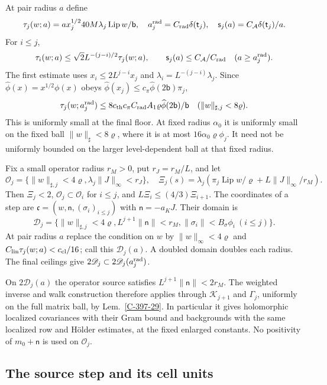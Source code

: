 \documentclass[11pt,letterpaper,reqno]{amsart}
\theoremstyle{definition}
\theoremstyle{remark}
\begin{document}
At pair radius $a$ define
\[
 \tau_j(w;a)=a x_j^{1/2}40M\lambda_j\operatorname{Lip}w/\mathsf b,
 \quad a_j^{\rm rad}=C_{\rm rad}\delta(\mathsf t_j),\quad
 \mathsf s_j(a)=C_{\mathcal A}\delta(\mathsf t_j)/a.
\]
For $i\le j$,
\begin{equation}\label{eq:qcd-source-radius-lag}
 \tau_i(w;a)\le\sqrt2L^{-(j-i)/2}\tau_j(w;a),\qquad
 \mathsf s_j(a)\le C_{\mathcal A}/C_{\rm rad}\quad(a\ge a_j^{\rm rad}).
\end{equation}
The first estimate uses $x_i\le2L^{j-i}x_j$ and
$\lambda_i=L^{-(j-i)}\lambda_j$.
Since $\widehat\phi(x)=x^{1/2}\phi(x)$ obeys
$\widehat\phi(x_j)\le c_\pi\widehat\phi(2\mathsf b)\pi_j$,
\[
 \tau_j(w;a_j^{\rm rad})\le
 8c_{\rm th}c_\pi C_{\rm rad}A_1\varrho
                       \widehat\phi(2\mathsf b)/\mathsf b
 \quad(\|w\|_{\sharp,j}<8\varrho).
\]
This is uniformly small at the final floor. At fixed radius
$\alpha_0$ it is uniformly small on the fixed ball
$\|w\|_\sharp<8\varrho$, where it is at most
$16\alpha_0\varrho\phi_j$. It need not be uniformly bounded
on the larger level-dependent ball at that fixed radius.

Fix a small operator radius $r_M>0$, put $r_J=r_M/L$, and let
\[
 \mathscr O_j=\{\|w\|_{\sharp,j}<4\varrho,
                    \lambda_j\|J\|_\infty<r_J\},\quad
 \Xi_j(s)=\lambda_j\left(
 \pi_j\operatorname{Lip}w/\varrho+L\|J\|_\infty/r_M\right).
\]
Then $\Xi_j<2$, $\mathscr O_j\subset\mathscr O_i$ for $i\le j$,
and $L\Xi_i\le(4/3)\Xi_{i+1}$.
The coordinates of a step are
$\mathfrak c=(w,\mathsf n,(\sigma_i)_{i\le j})$ with
$\mathsf n=-a_KJ$. Their domain is
\[
 \mathscr D_j=\{\|w\|_{\sharp,j}<4\varrho,
 L^{j+1}\|\mathsf n\|<r_M,
 \|\sigma_i\|<B_\sigma\phi_i\ (i\le j)\}.
\]
At pair radius $a$ replace the condition on $w$ by
$\|w\|_\infty<4\varrho$ and
$C_{\rm lin}\tau_j(w;a)<c_{\rm cl}/16$; call this
$\mathscr D_j(a)$. A doubled domain doubles each radius.
The final ceilings give
$2\mathscr D_j\subset2\mathscr D_j(a_j^{\rm rad})$.

On $2\mathscr D_j(a)$ the operator source satisfies
$L^{j+1}\|\mathsf n\|<2r_M$. The weighted inverse and walk
construction therefore applies through $\mathcal K_{j+1}$
and $\Gamma_j$, uniformly on the full matrix ball, by
Lem.~\ref{C-397-29}. In particular it gives holomorphic
localized covariances with their Gram bound and backgrounds
with the same localized row and H\"older estimates, at the
fixed enlarged constants. No positivity of
$m_0+\mathsf n$ is used on $\mathscr O_j$.

\subsection{The source step and its cell units}
\end{document}

